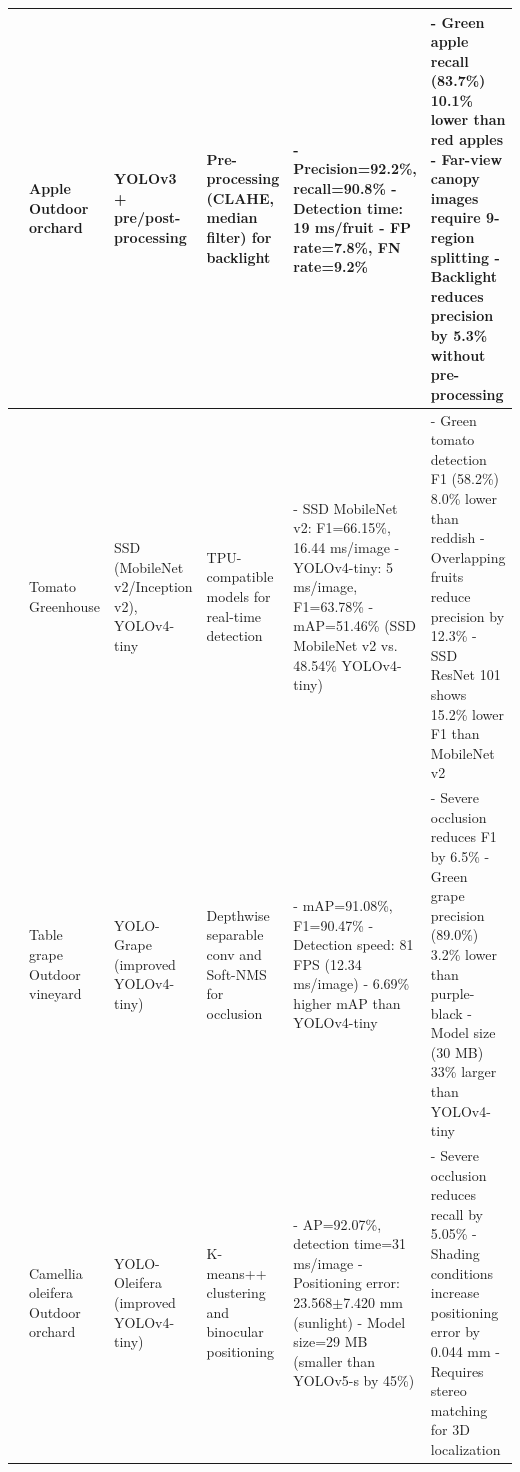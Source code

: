\documentclass{ieeeaccess}
\begin{document}
\begin{table}[htbp]
\begin{tabular}{@{}p{}p{}p{}p{}p{}p{}@{}}
	\cite{kuznetsova2020using} \newline 2020 & Apple \newline Outdoor orchard & YOLOv3 + pre/post-processing & Pre-processing (CLAHE, median filter) for backlight & - Precision=92.2\%, recall=90.8\% \newline - Detection time: 19 ms/fruit \newline - FP rate=7.8\%, FN rate=9.2\% & - Green apple recall (83.7\%) 10.1\% lower than red apples \newline - Far-view canopy images require 9-region splitting \newline - Backlight reduces precision by 5.3\% without pre-processing \\ \midrule
	\cite{magalhaes2021evaluating} \newline 2021 & Tomato \newline Greenhouse & SSD (MobileNet v2/Inception v2), YOLOv4-tiny & TPU-compatible models for real-time detection & - SSD MobileNet v2: F1=66.15\%, 16.44 ms/image \newline - YOLOv4-tiny: 5 ms/image, F1=63.78\% \newline - mAP=51.46\% (SSD MobileNet v2 vs. 48.54\% YOLOv4-tiny) & - Green tomato detection F1 (58.2\%) 8.0\% lower than reddish \newline - Overlapping fruits reduce precision by 12.3\% \newline - SSD ResNet 101 shows 15.2\% lower F1 than MobileNet v2 \\ \midrule
	\cite{li2021real} \newline 2021 & Table grape \newline Outdoor vineyard & YOLO-Grape (improved YOLOv4-tiny) & Depthwise separable conv and Soft-NMS for occlusion & - mAP=91.08\%, F1=90.47\% \newline - Detection speed: 81 FPS (12.34 ms/image) \newline - 6.69\% higher mAP than YOLOv4-tiny & - Severe occlusion reduces F1 by 6.5\% \newline - Green grape precision (89.0\%) 3.2\% lower than purple-black \newline - Model size (30 MB) 33\% larger than YOLOv4-tiny \\ \midrule
	\cite{tang2023fruit} \newline 2023 & Camellia oleifera \newline Outdoor orchard & YOLO-Oleifera (improved YOLOv4-tiny) & K-means++ clustering and binocular positioning & - AP=92.07\%, detection time=31 ms/image \newline - Positioning error: 23.568$\pm$7.420 mm (sunlight) \newline - Model size=29 MB (smaller than YOLOv5-s by 45\%) & - Severe occlusion reduces recall by 5.05\% \newline - Shading conditions increase positioning error by 0.044 mm \newline - Requires stereo matching for 3D localization \\ \midrule

\end{tabular}
\end{table}
\end{document}
